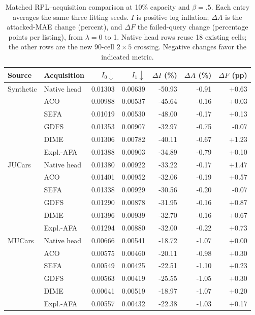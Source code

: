 \begin{table}[tbp]\centering\small
\caption{Matched RPL--acquisition comparison at 10\% capacity and $\beta=.5$. Each entry averages the same three fitting seeds. $I$ is positive log inflation; $\Delta A$ is the attacked-MAE change (percent), and $\Delta F$ the failed-query change (percentage points per listing), from $\lambda=0$ to 1. Native head rows reuse 18 existing cells; the other rows are the new 90-cell $2\times5$ crossing. Negative changes favor the indicated metric.}
\label{tab:rpl_crossing}
\setlength{\tabcolsep}{4pt}
\begin{tabular}{llrrrrr}\toprule
Source & Acquisition & $I_0\downarrow$ & $I_1\downarrow$ & $\Delta I$ (\%) & $\Delta A$ (\%) & $\Delta F$ (pp)\\\midrule
Synthetic & Native head & 0.01303 & 0.00639 & -50.93 & -0.91 & +0.63\\
 & ACO & 0.00988 & 0.00537 & -45.64 & -0.16 & +0.03\\
 & SEFA & 0.01019 & 0.00530 & -48.00 & -0.17 & +0.13\\
 & GDFS & 0.01353 & 0.00907 & -32.97 & -0.75 & -0.07\\
 & DIME & 0.01306 & 0.00782 & -40.11 & -0.67 & +1.23\\
 & Expl.-AFA & 0.01388 & 0.00903 & -34.89 & -0.79 & +0.10\\
\midrule
JUCars & Native head & 0.01380 & 0.00922 & -33.22 & -0.17 & +1.47\\
 & ACO & 0.01401 & 0.00952 & -32.06 & -0.19 & +0.57\\
 & SEFA & 0.01338 & 0.00929 & -30.56 & -0.20 & -0.07\\
 & GDFS & 0.01290 & 0.00878 & -31.95 & -0.16 & +0.87\\
 & DIME & 0.01396 & 0.00939 & -32.70 & -0.16 & +0.67\\
 & Expl.-AFA & 0.01294 & 0.00880 & -32.00 & -0.22 & +0.73\\
\midrule
MUCars & Native head & 0.00666 & 0.00541 & -18.72 & -1.07 & +0.00\\
 & ACO & 0.00575 & 0.00460 & -20.11 & -0.98 & +0.30\\
 & SEFA & 0.00549 & 0.00425 & -22.51 & -1.10 & +0.23\\
 & GDFS & 0.00563 & 0.00419 & -25.55 & -1.05 & +0.30\\
 & DIME & 0.00641 & 0.00519 & -18.97 & -1.07 & +0.20\\
 & Expl.-AFA & 0.00557 & 0.00432 & -22.38 & -1.03 & +0.17\\
\bottomrule\end{tabular}
\end{table}
